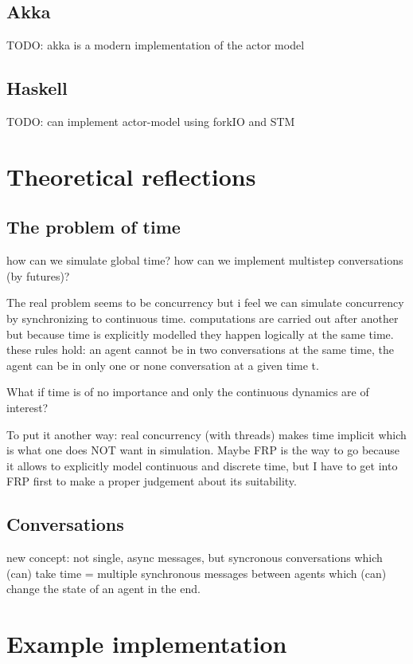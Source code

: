 \documentclass{article}
\begin{document}
\subsection{Akka}
TODO: akka is a modern implementation of the actor model

\subsection{Haskell}
TODO: can implement actor-model using forkIO and STM


\section{Theoretical reflections}

\subsection{The problem of time}
 how can we simulate global time? how can we implement multistep conversations (by futures)?

The real problem seems to be concurrency but i feel we can simulate concurrency by synchronizing to continuous time. computations are carried out after another but because time is explicitly modelled they happen logically at the same time. these rules hold: an agent cannot be in two conversations at the same time, the agent can be in only one or none conversation at a given time t.

What if time is of no importance and only the continuous dynamics are of interest?

To put it another way: real concurrency (with threads) makes time implicit which is what one does NOT want in simulation. Maybe FRP is the way to go because it allows to explicitly model continuous and discrete time, but I have to get into FRP first to make a proper judgement about its suitability.

\subsection{Conversations}
new concept: not single, async messages, but syncronous conversations which (can) take time = multiple synchronous messages between agents which (can) change the state of an agent in the end.

\section{Example implementation}
\end{document}
